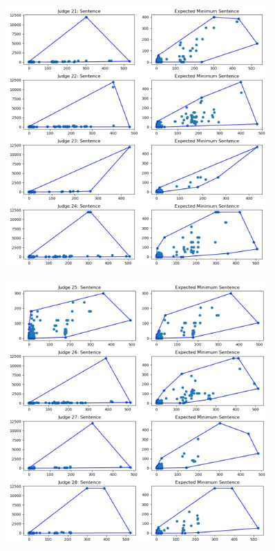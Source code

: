 \documentclass[11pt, oneside]{article}   	%
\theoremstyle{ModifiedStyle}
\begin{document}
			\begin{figure}[H]
				\centering
				\includegraphics[width=0.9\textwidth]{../../output/figures/Exploration/judge_convex_hulls_5.png}
			\end{figure}

			\begin{figure}[H]
				\centering
				\includegraphics[width=0.9\textwidth]{../../output/figures/Exploration/judge_convex_hulls_6.png}
			\end{figure}
\end{document}
